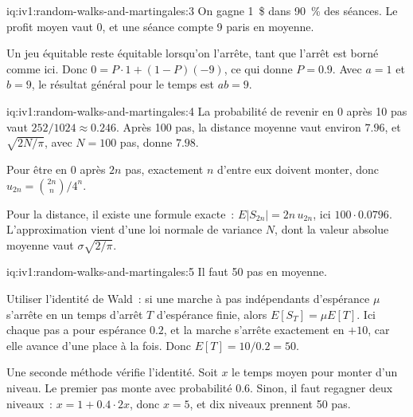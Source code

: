 \enlargethispage{-3\baselineskip}%
\begin{solution}{iq:iv1:random-walks-and-martingales:3}
On gagne 1~\$ dans 90~\% des séances. Le profit moyen vaut 0, et une séance compte 9 paris en moyenne.

Un jeu équitable reste équitable lorsqu'on l'arrête, tant que l'arrêt est borné comme ici. Donc $0 = P \cdot 1 + (1 - P)(-9)$, ce qui donne $P = 0.9$. Avec $a = 1$ et $b = 9$, le résultat général pour le temps est $ab = 9$.

\end{solution}

\begin{solution}{iq:iv1:random-walks-and-martingales:4}
La probabilité de revenir en 0 après 10 pas vaut $252/1024 \approx 0.246$. Après 100 pas, la distance moyenne vaut environ $7.96$, et $\sqrt{2N/\pi}$, avec $N = 100$ pas, donne $7.98$.

Pour être en 0 après $2n$ pas, exactement $n$ d'entre eux doivent monter, donc $u_{2n} = \binom{2n}{n}/4^n$.

Pour la distance, il existe une formule exacte~: $E|S_{2n}| = 2n\,u_{2n}$, ici $100 \cdot 0.0796$. L'approximation vient d'une loi normale de variance $N$, dont la valeur absolue moyenne vaut $\sigma\sqrt{2/\pi}$.

\end{solution}

\enlargethispage{-3\baselineskip}%
\begin{solution}{iq:iv1:random-walks-and-martingales:5}
Il faut 50 pas en moyenne.

Utiliser l'identité de Wald~: si une marche à pas indépendants d'espérance $\mu$ s'arrête en un temps d'arrêt $T$ d'espérance finie, alors $E[S_T] = \mu E[T]$. Ici chaque pas a pour espérance $0.2$, et la marche s'arrête exactement en $+10$, car elle avance d'une place à la fois. Donc $E[T] = 10/0.2 = 50$.

Une seconde méthode vérifie l'identité. Soit $x$ le temps moyen pour monter d'un niveau. Le premier pas monte avec probabilité $0.6$. Sinon, il faut regagner deux niveaux~: $x = 1 + 0.4 \cdot 2x$, donc $x = 5$, et dix niveaux prennent 50 pas.

\end{solution}

